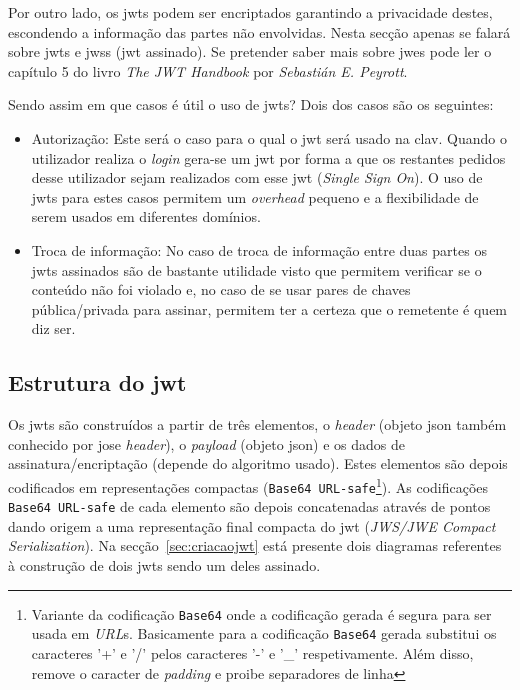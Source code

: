 Por outro lado, os \acrshort{jwt}s podem ser encriptados garantindo a privacidade destes, escondendo a informação das partes não envolvidas. Nesta secção apenas se falará sobre \acrshort{jwt}s e \acrshort{jws}s (\acrshort{jwt} assinado). Se pretender saber mais sobre \acrshort{jwe}s pode ler o capítulo 5 do livro \textit{The JWT Handbook} por \textit{Sebastián E. Peyrott}.

Sendo assim em que casos é útil o uso de \acrshort{jwt}s? Dois dos casos são os seguintes:
\begin{itemize}
    \item Autorização: Este será o caso para o qual o \acrshort{jwt} será usado na \acrshort{clav}. Quando o utilizador realiza o \textit{login} gera-se um \acrshort{jwt} por forma a que os restantes pedidos desse utilizador sejam realizados com esse \acrshort{jwt} (\textit{Single Sign On}). O uso de \acrshort{jwt}s para estes casos permitem um \textit{overhead} pequeno e a flexibilidade de serem usados em diferentes domínios.
    \item Troca de informação: No caso de troca de informação entre duas partes os \acrshort{jwt}s assinados são de bastante utilidade visto que permitem verificar se o conteúdo não foi violado e, no caso de se usar pares de chaves pública/privada para assinar, permitem ter a certeza que o remetente é quem diz ser.
\end{itemize}

\subsection{Estrutura do \acrshort{jwt}}

Os \acrshort{jwt}s são construídos a partir de três elementos, o \textit{header} (objeto \acrshort{json} também conhecido por \acrshort{jose} \textit{header}), o \textit{payload} (objeto \acrshort{json}) e os dados de assinatura/encriptação (depende do algoritmo usado). Estes elementos são depois codificados em representações compactas (\texttt{Base64 URL-safe}\footnote{Variante da codificação \texttt{Base64} onde a codificação gerada é segura para ser usada em \textit{URL}s. Basicamente para a codificação \texttt{Base64} gerada substitui os caracteres '+' e '/' pelos caracteres '-' e '\_' respetivamente. Além disso, remove o caracter de \textit{padding} e proibe separadores de linha}). As codificações \texttt{Base64 URL-safe} de cada elemento são depois concatenadas através de pontos dando origem a uma representação final compacta do \acrshort{jwt} (\textit{JWS/JWE Compact Serialization}). Na secção~\ref{sec:criacaojwt} está presente dois diagramas referentes à construção de dois \acrshort{jwt}s sendo um deles assinado.

